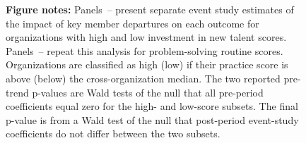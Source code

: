 \begin{figure}[ht]
  \begin{minipage}{1\textwidth}
    \vspace{0.6em}
    \textbf{Figure notes:}
    Panels~-- present separate event study estimates of the impact of key member departures on each outcome for organizations with high and low investment in new talent scores.
    Panels~-- repeat this analysis for problem-solving routine scores.
    Organizations are classified as high (low) if their practice score is above (below) the cross-organization median.
    \EventStudySharedNotes
    The two reported pre-trend p-values are Wald tests of the null that all pre-period coefficients equal zero for the high- and low-score subsets.
    The final p-value is from a Wald test of the null that post-period event-study coefficients do not differ between the two subsets.
  \end{minipage}
\end{figure}
